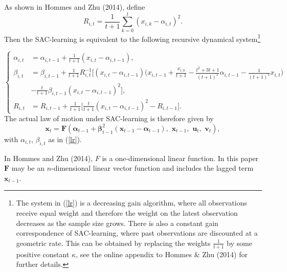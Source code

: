 As shown in Hommes and Zhu (2014), define
\begin{equation*}
R_{i,t}=\frac{1}{t+1}\sum_{k=0}^{t}(x_{i,k}-\alpha_{i,t})^2.
\end{equation*}
Then the SAC-learning is equivalent to  the following recursive
dynamical system\footnote{The system in (\ref{lr}) is a decreasing gain algorithm, where all observations receive equal weight and therefore the weight on the latest observation decreases as the sample size grows. There is also a constant gain correspondence of SAC-learning,
 where past observations are discounted at a geometric rate. This can be obtained by replacing the weights $\frac{1}{t+1}$ by some positive constant $\kappa$, see the online appendix to Hommes \& Zhu (2014) for further details.}



\begin{equation}\label{lr}
    \left\{
    \begin{split}
\alpha_{i,t}&=\alpha_{i,t-1}+\frac{1}{t+1}(x_{i,t}-\alpha_{i,t-1}), \\
\beta_{i,t}&=\beta_{i,t-1}+\frac{1}{t+1}R_{i,t}^{-1}\Big[(x_{i,t}-\alpha_{i,t-1})\big(x_{i,t-1}+\frac{x_{i,0}}{t+1}-\frac{t^2+3t+1}{(t+1)^2}\alpha_{i,t-1}-\frac{1}{(t+1)^2}x_{i,t}\big)\\
& -\frac{t}{t+1}\beta_{i,t-1}(x_{i,t}-\alpha_{i,t-1})^2\Big],\\
R_{i,t}&=R_{i,t-1}+\frac{1}{t+1}\Big[\frac{t}{t+1}(x_{i,t}-\alpha_{i,t-1})^2-R_{i,t-1}\Big].
\end{split}
    \right.
    \end{equation}
The actual law of motion under SAC-learning is therefore given by
\begin{equation}\label{xsac}
     {\pmb  x}_{t}=\pmb{F}( {\pmb \alpha}_{t-1}+ {\pmb \beta}^2_{t-1}( {\pmb x}_{t-1}- {\pmb \alpha}_{t-1}),\,\,{\pmb x}_{t-1},\,\, {\pmb u}_t,
      \,\, {\pmb v}_t),
\end{equation}
with $\alpha_{i,t}$, $ \beta_{i,t}$ as in (\ref{lr}).%

In Hommes and Zhu (2014), $F$ is a one-dimensional linear function. In this paper $\pmb F$ may be an $n$-dimensional linear vector function and includes the lagged term ${\pmb x}_{t-1}$.
